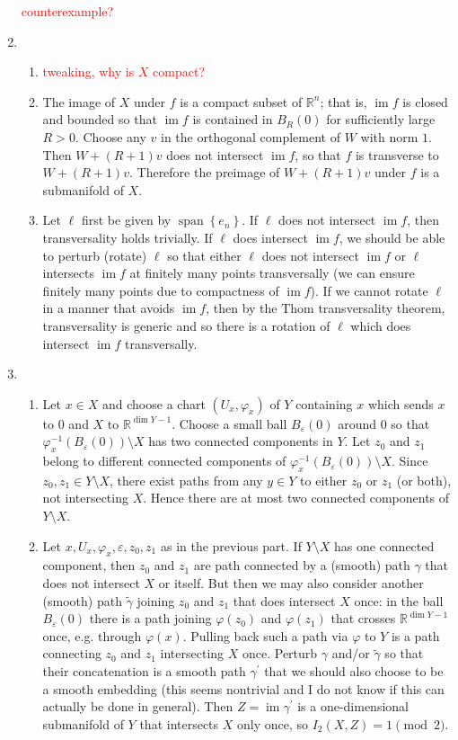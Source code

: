 \documentclass[11pt,leqno]{article}
\theoremstyle{plain}
\theoremstyle{definition}
\numberwithin{equation}{section}
\numberwithin{lem}{section}
\newcommand{\cbr}[1]{\left\{#1\right\}}
\DeclareMathOperator{\Span}{span}
\DeclareMathOperator{\im}{im}
\begin{document}
\begin{enumerate}
    \textcolor{red}{counterexample?}
    \item\begin{enumerate}
      \item \textcolor{red}{tweaking, why is $X$ compact?}
      \item The image of $X$ under $f$ is a compact subset of $\mathbb R^n$; that is, $\im f$ is closed and bounded so that $\im f$ is contained in $B_R(0)$ for sufficiently large $R>0$. Choose any $v$ in the orthogonal complement of $W$ with norm $1$. Then $W + (R+1)v$ does not intersect $\im f$, so that $f$ is transverse to $W + (R+1)v$. Therefore the preimage of $W+ (R+1)v$ under $f$ is a submanifold of $X$.
      \item Let $\ell$ first be given by $\Span\cbr{e_n}$. If $\ell$ does not intersect $\im f$, then transversality holds trivially. If $\ell$ does intersect $\im f$, we should be able to perturb (rotate) $\ell$ so that either $\ell$ does not intersect $\im f$ or $\ell$ intersects $\im f$ at finitely many points transversally (we can ensure finitely many points due to compactness of $\im f$). If we cannot rotate $\ell$ in a manner that avoids $\im f$, then by the Thom transversality theorem, transversality is generic and so there is a rotation of $\ell$ which does intersect $\im f$ transversally.
    \end{enumerate}
    \item \begin{enumerate}
      \item Let $x\in X$ and choose a chart $(U_x,\varphi_x)$ of $Y$ containing $x$ which sends $x$ to $0$ and $X$ to $\mathbb R^{\dim Y-1}$. Choose a small ball $B_\varepsilon(0)$ around $0$ so that $\varphi_x^{-1}(B_\varepsilon(0))\setminus X$ has two connected components in $Y$. Let $z_0$ and $z_1$ belong to different connected components of $\varphi_x^{-1}(B_\varepsilon(0))\setminus X$. Since $z_0,z_1\in Y\setminus X$, there exist paths from any $y\in Y$ to either $z_0$ or $z_1$ (or both), not intersecting $X$. Hence there are at most two connected components of $Y\setminus X$.
      \item Let $x,U_x,\varphi_x,\varepsilon,z_0,z_1$ as in the previous part. If $Y\setminus X$ has one connected component, then $z_0$ and $z_1$ are path connected by a (smooth) path $\gamma$ that does not intersect $X$ or itself. But then we may also consider another (smooth) path $\tilde\gamma$ joining $z_0$ and $z_1$ that does intersect $X$ once: in the ball $B_\varepsilon(0)$ there is a path joining $\varphi(z_0)$ and $\varphi(z_1)$ that crosses $\mathbb R^{\dim Y-1}$ once, e.g. through $\varphi(x)$. Pulling back such a path via $\varphi$ to $Y$ is a path connecting $z_0$ and $z_1$ intersecting $X$ once. Perturb $\gamma$ and/or $\tilde\gamma$ so that their concatenation is a smooth path $\gamma^\prime$ that we should also choose to be a smooth embedding (this seems nontrivial and I do not know if this can actually be done in general). Then $Z = \im \gamma^\prime$ is a one-dimensional submanifold of $Y$ that intersects $X$ only once, so $I_2(X,Z) = 1\pmod 2$.

\end{enumerate}
\end{enumerate}
\end{document}
